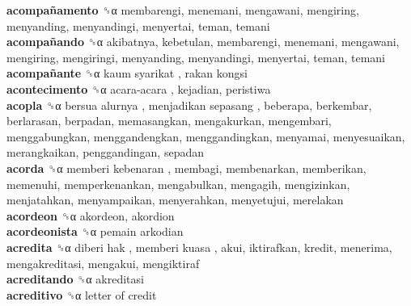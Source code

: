 \textbf{acompañamento} ␝α  membarengi, menemani, mengawani, mengiring, menyanding, menyandingi, menyertai, teman, temani  \\
\textbf{acompañando} ␝α  akibatnya, kebetulan, membarengi, menemani, mengawani, mengiring, mengiringi, menyanding, menyandingi, menyertai, teman, temani  \\
\textbf{acompañante} ␝α   kaum syarikat ,  rakan kongsi   \\
\textbf{acontecimento} ␝α   acara-acara , kejadian, peristiwa  \\
\textbf{acopla} ␝α   bersua alurnya ,  menjadikan sepasang , beberapa, berkembar, berlarasan, berpadan, memasangkan, mengakurkan, mengembari, menggabungkan, menggandengkan, menggandingkan, menyamai, menyesuaikan, merangkaikan, penggandingan, sepadan  \\
\textbf{acorda} ␝α   memberi kebenaran , membagi, membenarkan, memberikan, memenuhi, memperkenankan, mengabulkan, mengagih, mengizinkan, menjatahkan, menyampaikan, menyerahkan, menyetujui, merelakan  \\
\textbf{acordeon} ␝α  akordeon, akordion  \\
\textbf{acordeonista} ␝α   pemain arkodian   \\
\textbf{acredita} ␝α   diberi hak ,  memberi kuasa , akui, iktirafkan, kredit, menerima, mengakreditasi, mengakui, mengiktiraf  \\
\textbf{acreditando} ␝α  akreditasi  \\
\textbf{acreditivo} ␝α   letter of credit   \\
